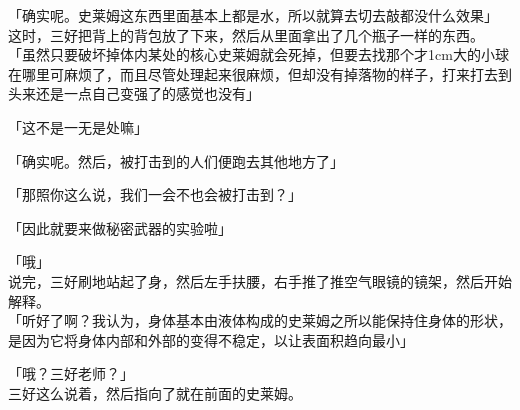 「确实呢。史莱姆这东西里面基本上都是水，所以就算去切去敲都没什么效果」\\

这时，三好把背上的背包放了下来，然后从里面拿出了几个瓶子一样的东西。\\

「虽然只要破坏掉体内某处的核心史莱姆就会死掉，但要去找那个才1cm大的小球在哪里可麻烦了，而且尽管处理起来很麻烦，但却没有掉落物的样子，打来打去到头来还是一点自己变强了的感觉也没有」

「这不是一无是处嘛」

「确实呢。然后，被打击到的人们便跑去其他地方了」

「那照你这么说，我们一会不也会被打击到？」

「因此就要来做秘密武器的实验啦」

「哦」\\

说完，三好刷地站起了身，然后左手扶腰，右手推了推空气眼镜的镜架，然后开始解释。\\

「听好了啊？我认为，身体基本由液体构成的史莱姆之所以能保持住身体的形状，是因为它将身体内部和外部的变得不稳定，以让表面积趋向最小」

「哦？三好老师？」\\

三好这么说着，然后指向了就在前面的史莱姆。

